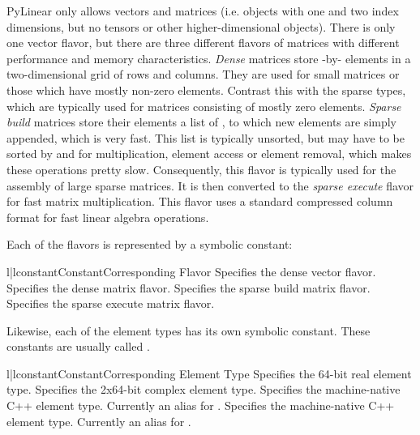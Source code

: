 PyLinear only allows vectors and matrices (i.e.  objects with one and
two index dimensions, but no tensors or other higher-dimensional
objects). There is only one vector flavor, but there are three
different flavors of matrices with different performance and memory
characteristics. \emph{Dense} matrices store -by-
elements in a two-dimensional grid of  rows and 
columns. They are used for small matrices or those which have mostly
non-zero elements. Contrast this with the sparse types, which are
typically used for matrices consisting of mostly zero
elements. \emph{Sparse build} matrices store their elements a list of
, to which new elements are simply appended,
which is very fast. This list is typically unsorted, but may have to
be sorted by  and  for multiplication, element access or
element removal, which makes these operations pretty
slow. Consequently, this flavor is typically used for the assembly of
large sparse matrices. It is then converted to the \emph{sparse
execute} flavor for fast matrix multiplication. This flavor uses a
standard compressed column format for fast linear algebra operations.

Each of the flavors is represented by a symbolic constant:

\begin{tableii}{l|l}{constant}{Constant}{Corresponding Flavor}
         {Specifies the dense vector flavor.}
         {Specifies the dense matrix flavor.}
         {Specifies the sparse build matrix flavor.}
         {Specifies the sparse execute matrix flavor.}
\end{tableii}

Likewise, each of the element types has its own symbolic constant.
These constants are usually called .

\begin{tableii}{l|l}{constant}{Constant}{Corresponding Element Type}
         {Specifies the 64-bit real element type.}
         {Specifies the 2x64-bit complex element type.}
         {Specifies the machine-native C++  element type.
          Currently an alias for .}
         {Specifies the machine-native C++  
          element type. Currently an alias for .}
\end{tableii}

